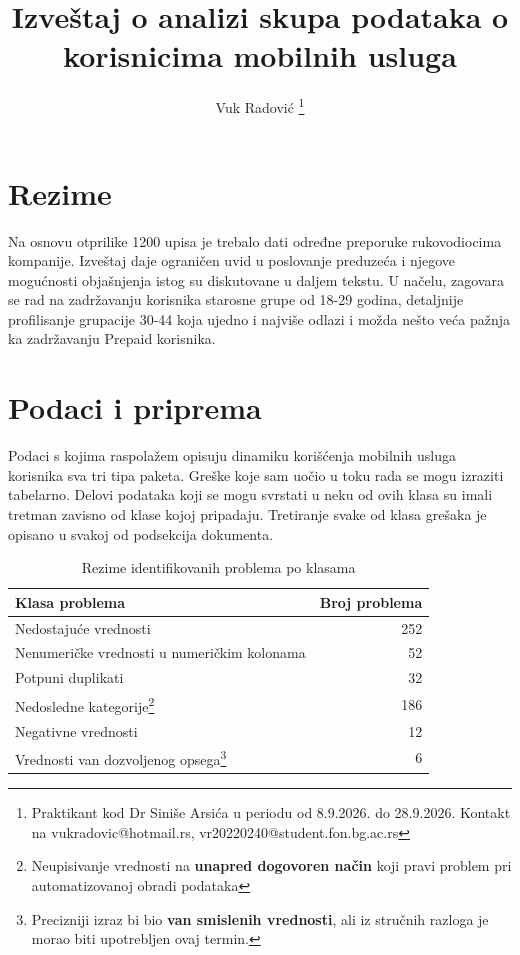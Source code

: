 \documentclass[a4paper,12pt]{article}
\title{Izveštaj o analizi skupa podataka o korisnicima mobilnih usluga}
\author{Vuk Radović
    \footnote{
        Praktikant kod Dr Siniše Arsića u periodu od 8.9.2026. do 28.9.2026. Kontakt na vukradovic@hotmail.rs, vr20220240@student.fon.bg.ac.rs}}
\begin{document}
\maketitle

    \section*{Rezime}

    Na osnovu otprilike 1200 upisa je trebalo dati određne preporuke rukovodiocima kompanije. Izveštaj daje ograničen
    uvid u poslovanje preduzeća i njegove mogućnosti objašnjenja istog su diskutovane u daljem tekstu. U načelu,
    zagovara se rad na zadržavanju korisnika starosne grupe od 18-29 godina, detaljnije profilisanje grupacije 30-44
    koja ujedno i najviše odlazi i možda nešto veća pažnja ka zadržavanju Prepaid korisnika.

    \section*{Podaci i priprema}

    Podaci s kojima raspolažem opisuju dinamiku korišćenja mobilnih usluga korisnika sva tri tipa paketa. 
    Greške koje sam uočio u toku rada se mogu izraziti tabelarno. Delovi podataka koji se mogu svrstati u neku od ovih klasa su imali tretman zavisno od klase kojoj pripadaju.
    Tretiranje svake od klasa grešaka je opisano u svakoj od podsekcija dokumenta.

    \begin{table}[htbp]
    \centering
    \caption{Rezime identifikovanih problema po klasama}
    \label{tab:rezime-problema}
    \small
    \begin{tabular}{l r}
    \toprule
    \textbf{Klasa problema} & \textbf{Broj problema} \\
    \midrule
    Nedostajuće vrednosti & 252 \\
    Nenumeričke vrednosti u numeričkim kolonama & 52 \\
    Potpuni duplikati & 32 \\
    Nedosledne kategorije\footnote{Neupisivanje vrednosti na \textbf{unapred dogovoren način} koji pravi problem pri automatizovanoj obradi podataka} & 186 \\
    Negativne vrednosti & 12 \\
    Vrednosti van dozvoljenog opsega\footnote{Precizniji izraz bi bio \textbf{van smislenih vrednosti}, ali iz stručnih razloga je morao biti upotrebljen ovaj termin.} & 6 \\
    \bottomrule
    \end{tabular}
    \end{table}
\end{document}
